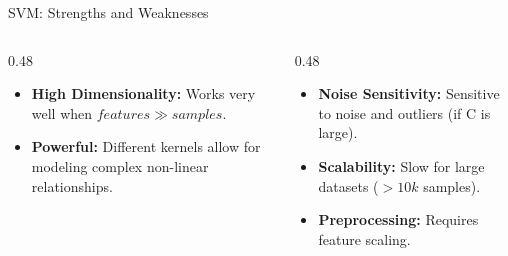 

\begin{frame}{SVM: Strengths and Weaknesses}
    \begin{columns}[T]
        \begin{column}{0.48\textwidth}
            \begin{tcolorbox}[colback=green!5, title=\textbf{Advantages}]
                \small
                \begin{itemize}
                    \item \textbf{High Dimensionality:} Works very well when $features \gg samples$.
                    \item \textbf{Powerful:} Different kernels allow for modeling complex non-linear relationships.
                \end{itemize}
            \end{tcolorbox}
        \end{column}
        \begin{column}{0.48\textwidth}
            \begin{tcolorbox}[colback=red!5, title=\textbf{Disadvantages}]
                \small
                \begin{itemize}
                    \item \textbf{Noise Sensitivity:} Sensitive to noise and outliers (if C is large).
                    \item \textbf{Scalability:} Slow for large datasets ($>10k$ samples).
                    \item \textbf{Preprocessing:} Requires feature scaling.
                \end{itemize}
            \end{tcolorbox}
        \end{column}
    \end{columns}
\end{frame}


